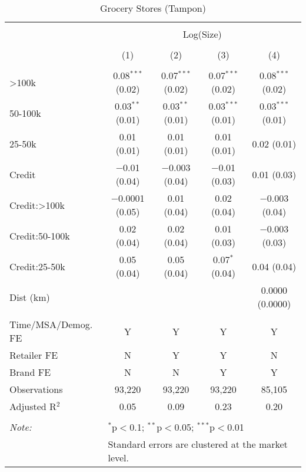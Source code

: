 
\begin{table}[!htbp] \centering 
  \caption{Grocery Stores (Tampon)} 
  \label{tab:packageSizeGroceryTamponLiq} 
\begin{tabular}{@{\extracolsep{5pt}}lcccc} 
\\[-1.8ex]\hline 
\hline \\[-1.8ex] 
 & \multicolumn{4}{c}{Log(Size)} \\ 
\\[-1.8ex] & (1) & (2) & (3) & (4)\\ 
\hline \\[-1.8ex] 
 >100k & 0.08$^{***}$ (0.02) & 0.07$^{***}$ (0.02) & 0.07$^{***}$ (0.02) & 0.08$^{***}$ (0.02) \\ 
  50-100k & 0.03$^{**}$ (0.01) & 0.03$^{**}$ (0.01) & 0.03$^{***}$ (0.01) & 0.03$^{***}$ (0.01) \\ 
  25-50k & 0.01 (0.01) & 0.01 (0.01) & 0.01 (0.01) & 0.02 (0.01) \\ 
  Credit & $-$0.01 (0.04) & $-$0.003 (0.04) & $-$0.01 (0.03) & 0.01 (0.03) \\ 
  Credit:>100k & $-$0.0001 (0.05) & 0.01 (0.04) & 0.02 (0.04) & $-$0.003 (0.04) \\ 
  Credit:50-100k & 0.02 (0.04) & 0.02 (0.04) & 0.01 (0.03) & $-$0.003 (0.03) \\ 
  Credit:25-50k & 0.05 (0.04) & 0.05 (0.04) & 0.07$^{*}$ (0.04) & 0.04 (0.04) \\ 
  Dist (km) &  &  &  & 0.0000 (0.0000) \\ 
 \hline \\[-1.8ex] 
Time/MSA/Demog. FE & Y & Y & Y & Y \\ 
Retailer FE & N & Y & Y & N \\ 
Brand FE & N & N & Y & Y \\ 
Observations & 93,220 & 93,220 & 93,220 & 85,105 \\ 
Adjusted R$^{2}$ & 0.05 & 0.09 & 0.23 & 0.20 \\ 
\hline 
\hline \\[-1.8ex] 
\textit{Note:}  & \multicolumn{4}{l}{$^{*}$p$<$0.1; $^{**}$p$<$0.05; $^{***}$p$<$0.01} \\ 
 & \multicolumn{4}{l}{Standard errors are clustered at the market level.} \\ 
\end{tabular} 
\end{table} 

